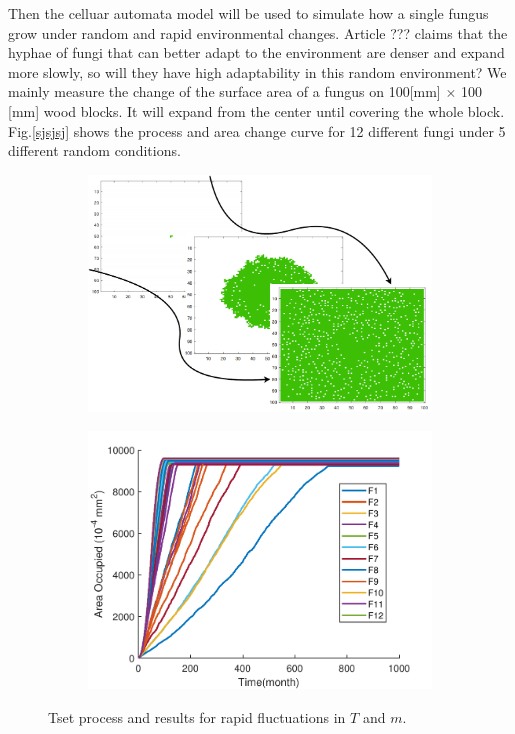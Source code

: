 \documentclass{mcmthesis}
\begin{document}
\par Then the celluar automata model will be used to simulate how a single fungus grow under random and rapid environmental changes. Article ??? claims that the hyphae of fungi that can better adapt to the environment are denser and expand more slowly, so will they have high adaptability in this random environment? We mainly measure the change of the surface area of a fungus on 100[mm] $\times$ 100 [mm] wood blocks. It will expand from the center until covering the whole block. Fig.\eqref{sjsjsj} shows the process and area change curve for 12 different fungi under 5 different random conditions.
\begin{figure}[H]
	\centering
	\begin{subfigure}{0.45\textwidth}
		\includegraphics[width=\textwidth]{./picture/SJflow.pdf}
	\end{subfigure}
	\begin{subfigure}{0.45\textwidth}
		\includegraphics[width=\textwidth]{./picture/12for5.pdf}
	\end{subfigure}
	\caption{Tset process and results for rapid fluctuations in $T$ and $m$.}
	\label{sjsjsj}
\end{figure}
\end{document}

